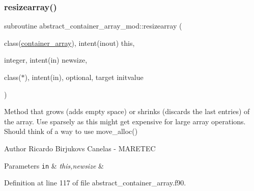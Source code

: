 \subsubsection{\texorpdfstring{resizearray()}{resizearray()}}
{\footnotesize\ttfamily subroutine abstract\+\_\+container\+\_\+array\+\_\+mod\+::resizearray (\begin{DoxyParamCaption}\item[{class(\mbox{\hyperlink{structabstract__container__array__mod_1_1container__array}{container\+\_\+array}}), intent(inout)}]{this,  }\item[{integer, intent(in)}]{newsize,  }\item[{class($\ast$), intent(in), optional, target}]{initvalue }\end{DoxyParamCaption})\hspace{0.3cm}{\ttfamily [private]}}



Method that grows (adds empty space) or shrinks (discards the last entries) of the array. Use sparsely as this might get expensive for large array operations. Should think of a way to use move\+\_\+alloc() 

\begin{DoxyAuthor}{Author}
Ricardo Birjukovs Canelas -\/ M\+A\+R\+E\+T\+EC 
\end{DoxyAuthor}

\begin{DoxyParams}[1]{Parameters}
\mbox{\tt in}  & {\em this,newsize} & \\
\hline
\end{DoxyParams}


Definition at line 117 of file abstract\+\_\+container\+\_\+array.\+f90.



